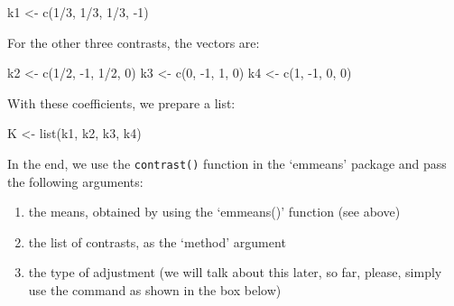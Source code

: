 \documentclass[a4paper,12pt,oneside]{book}
\providecommand{\tightlist}{%
  \setlength{\itemsep}{0pt}\setlength{\parskip}{0pt}}
\newenvironment{Shaded}{\begin{snugshade}}{\end{snugshade}}
\newcommand{\DecValTok}[1]{#1}
\newcommand{\SpecialCharTok}[1]{#1}
\newcommand{\OtherTok}[1]{#1}
\newcommand{\FunctionTok}[1]{#1}
\newcommand{\NormalTok}[1]{#1}
\begin{document}
\begin{Shaded}
\begin{Highlighting}[]
\NormalTok{k1 }\OtherTok{\textless{}{-}} \FunctionTok{c}\NormalTok{(}\DecValTok{1}\SpecialCharTok{/}\DecValTok{3}\NormalTok{, }\DecValTok{1}\SpecialCharTok{/}\DecValTok{3}\NormalTok{, }\DecValTok{1}\SpecialCharTok{/}\DecValTok{3}\NormalTok{, }\SpecialCharTok{{-}}\DecValTok{1}\NormalTok{)}
\end{Highlighting}
\end{Shaded}

For the other three contrasts, the vectors are:

\begin{Shaded}
\begin{Highlighting}[]
\NormalTok{k2 }\OtherTok{\textless{}{-}} \FunctionTok{c}\NormalTok{(}\DecValTok{1}\SpecialCharTok{/}\DecValTok{2}\NormalTok{, }\SpecialCharTok{{-}}\DecValTok{1}\NormalTok{, }\DecValTok{1}\SpecialCharTok{/}\DecValTok{2}\NormalTok{, }\DecValTok{0}\NormalTok{)}
\NormalTok{k3 }\OtherTok{\textless{}{-}} \FunctionTok{c}\NormalTok{(}\DecValTok{0}\NormalTok{, }\SpecialCharTok{{-}}\DecValTok{1}\NormalTok{, }\DecValTok{1}\NormalTok{, }\DecValTok{0}\NormalTok{)}
\NormalTok{k4 }\OtherTok{\textless{}{-}} \FunctionTok{c}\NormalTok{(}\DecValTok{1}\NormalTok{, }\SpecialCharTok{{-}}\DecValTok{1}\NormalTok{, }\DecValTok{0}\NormalTok{, }\DecValTok{0}\NormalTok{)}
\end{Highlighting}
\end{Shaded}

With these coefficients, we prepare a list:

\begin{Shaded}
\begin{Highlighting}[]
\NormalTok{K }\OtherTok{\textless{}{-}} \FunctionTok{list}\NormalTok{(k1, k2, k3, k4)}
\end{Highlighting}
\end{Shaded}

In the end, we use the \texttt{contrast()} function in the `emmeans' package and pass the following arguments:

\begin{enumerate}
\def\labelenumi{\arabic{enumi}.}
\tightlist
\item
  the means, obtained by using the `emmeans()' function (see above)
\item
  the list of contrasts, as the `method' argument
\item
  the type of adjustment (we will talk about this later, so far, please, simply use the command as shown in the box below)
\end{enumerate}
\end{document}
